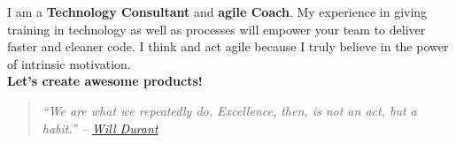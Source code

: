 \documentclass[9pt]{developercv} %
\newenvironment{itquote}
{\begin{quote}\itshape}
{\end{quote}}
\begin{document}

\begin{minipage}[t]{0.4\textwidth} %
	\vspace{-\baselineskip} %
  I am a \textbf{Technology Consultant} and \textbf{agile Coach}.
  My experience in giving training in technology as well as processes will empower your team to deliver faster and cleaner code.
  I think and act agile because I truly believe in the power of intrinsic motivation.\\
  \textbf{Let's create awesome products!}
  \begin{itquote} 
    ``We are what we repeatedly do. Excellence, then, is not an act, but a habit.'' -- 
    \href{https://medium.com/the-mission/my-favourite-quote-of-all-time-is-a-misattribution-66356f22843d}{Will Durant}\\
  \end{itquote}
\end{minipage}
\hfill %
\begin{minipage}[t]{0.5\textwidth} %
	\vspace{-\baselineskip} %
	\begin{barchart}{5.5}
	\end{barchart}
  \vspace{0.4cm}
\end{minipage}


\end{document}
